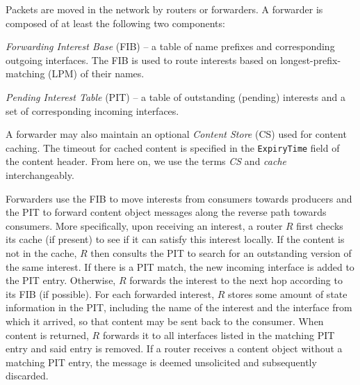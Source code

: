Packets are moved in the network by routers or forwarders. A forwarder is composed
of at least the following two components:
\begin{compactitem}
\item {\em Forwarding Interest Base} (FIB) -- a table of name prefixes and
  corresponding outgoing interfaces. The FIB is used to route interests based on
  longest-prefix-matching (LPM) of their names.
\item {\em Pending Interest Table} (PIT) -- a table of outstanding (pending)
  interests and a set of corresponding incoming interfaces.
\end{compactitem}
%
A forwarder may also maintain an optional {\em Content Store} (CS) used for content
caching. The timeout for cached content is specified in the \texttt{ExpiryTime}
field of the content header. From here on, we use the terms {\em CS} and
{\em cache} interchangeably.

Forwarders use the FIB to move interests from consumers towards producers and the PIT
to forward content object messages along the reverse path towards consumers. More
specifically, upon receiving an interest, a router $R$ first checks its cache
(if present) to see if it can satisfy this interest locally. If the content is
not in the cache, $R$ then consults the PIT to search for an outstanding
version of the same interest. If there is a PIT match, the new incoming interface
is added to the PIT entry. Otherwise, $R$ forwards the interest to the next hop
according to its FIB (if possible). For each forwarded interest, $R$ stores
some amount of state information in the PIT, including the name of the interest and the
interface from which it arrived, so that content may be sent back to the
consumer. When content is returned, $R$ forwards it to all interfaces listed in
the matching PIT entry and said entry is removed. If a router receives a content object
without a matching PIT entry, the message is deemed unsolicited and subsequently
discarded.
